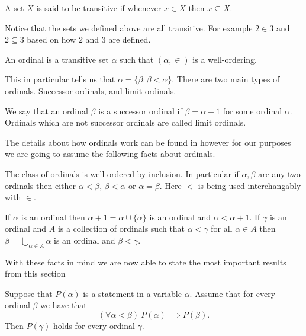 \begin{defn}[Transitive]
  A set $X$ is said to be transitive if whenever $x \in X$ then $x \subseteq
  X$.
\end{defn}

Notice that the sets we defined above are all transitive. For example $2 \in 3$
and $2 \subseteq 3$ based on how $2$ and $3$ are defined. 

\begin{defn}[Ordinal]
  An ordinal is a transitive set $\alpha$ such that $(\alpha, \in)$ is
  a well-ordering.
\end{defn}

This in particular tells us that $\alpha = \{\beta: \beta < \alpha\}$. 
There are two main types of ordinals. Successor ordinals, and limit ordinals.

\begin{defn}
  We say that an ordinal $\beta$ is a successor ordinal if $\beta = \alpha + 1$ 
  for some ordinal $\alpha$. Ordinals which are not successor ordinals are
  called limit ordinals.
\end{defn}

The details about how ordinals work can be found in \cite{Schimmerling2011-li} however for our purposes we are going to assume the following
facts about ordinals.

\begin{lemma}
  The class of ordinals is well ordered by inclusion. In particular if
  $\alpha, \beta$ are any two ordinals then either $\alpha < \beta$, $\beta
  < \alpha$ or $\alpha = \beta$. Here $<$ is being used interchangably with
  $\in$.
\end{lemma}

\begin{lemma}
  If $\alpha$ is an ordinal then $\alpha + 1 = \alpha \cup \{\alpha\}$ is an
  ordinal and $\alpha < \alpha + 1$. If $\gamma$ is an ordinal and $A$ is
  a collection of ordinals such that $\alpha < \gamma$ for all $\alpha \in A$ 
  then $\beta = \bigcup_{\alpha \in A} \alpha$ is an ordinal and $\beta
  < \gamma$.
\end{lemma}

With these facts in mind we are now able to state the most important results
from this section

\begin{thm}
  Suppose that $P(\alpha)$ is a statement in a variable $\alpha$. Assume that
  for every ordinal $\beta$ we have that
   \[
     (\forall \alpha < \beta)\  P(\alpha) \implies P(\beta)
  .\] 
  Then $P(\gamma)$ holds for every ordinal $\gamma$.
\end{thm}

